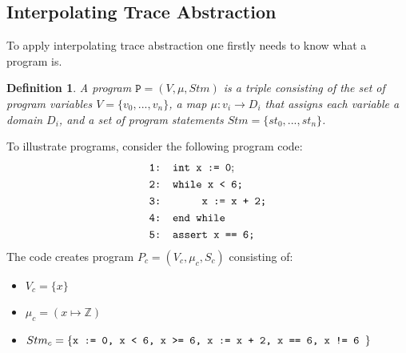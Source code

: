 \documentclass{article}
\newtheorem{mydef}{Definition}
\begin{document}
\subsection{Interpolating Trace Abstraction}
To apply interpolating trace abstraction one firstly needs to know what a program is.
\begin{mydef}
	A program $\texttt{P} = (V, \mu, Stm)$ is a triple consisting of the set of program variables $V = \{v_0, ..., v_n\}$, a map $\mu: v_i \rightarrow D_i$ that assigns each variable a domain $D_i$, and a set of program statements $Stm = \{st_0, ..., st_n\}$.
\end{mydef}
To illustrate programs, consider the following program code:
	\begin{align*}
		&\texttt{1: int x := 0}; \\
		&\texttt{2: while x < 6;} \\
		&\texttt{3: \hspace*{2em} x := x + 2;} \\
		&\texttt{4: end while} \\
		&\texttt{5: assert x == 6;}
	\end{align*}
	\label{fig:square}
\vspace*{1cm}
The code creates program $P_c = (V_c, \mu_c, S_c)$ consisting of:
\begin{itemize}
	\item $V_c = \{x\}$
	\item $\mu_c =(x \mapsto \mathbb{Z}) $
	\item $Stm_c = \{ \texttt{x := 0, \texttt{x < 6}, \texttt{x >= 6}, \texttt{x := x + 2}, \texttt{x == 6}, \texttt{x != 6} }\}$
\end{itemize}
\end{document}
